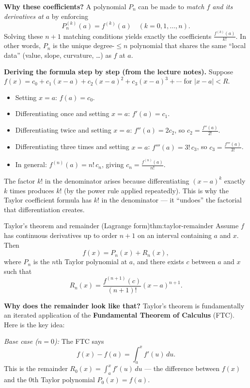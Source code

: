 \noindent\textbf{Why these coefficients?}
A polynomial $P_n$ can be made to \emph{match $f$ and its derivatives at $a$} by enforcing
\[
P_n^{(k)}(a)=f^{(k)}(a)\quad (k=0,1,\dots,n).
\]
Solving these $n{+}1$ matching conditions yields exactly the coefficients $\frac{f^{(k)}(a)}{k!}$. In other words,
$P_n$ is the unique degree-$\le n$ polynomial that shares the same ``local data'' (value, slope, curvature, \dots) as $f$ at $a$.

\noindent\textbf{Deriving the formula step by step (from the lecture notes).}
Suppose $f(x)=c_0+c_1(x-a)+c_2(x-a)^2+c_3(x-a)^3+\cdots$ for $|x-a|<R$.
\begin{itemize}[leftmargin=*]
\item Setting $x=a$: $f(a)=c_0$.
\item Differentiating once and setting $x=a$: $f'(a)=c_1$.
\item Differentiating twice and setting $x=a$: $f''(a)=2c_2$, so $c_2=\frac{f''(a)}{2!}$.
\item Differentiating three times and setting $x=a$: $f'''(a)=3!\,c_3$, so $c_3=\frac{f'''(a)}{3!}$.
\item In general: $f^{(n)}(a)=n!\,c_n$, giving $c_n=\frac{f^{(n)}(a)}{n!}$.
\end{itemize}
The factor $k!$ in the denominator arises because differentiating $(x-a)^k$ exactly $k$ times produces $k!$ (by the power rule applied repeatedly).
This is why the Taylor coefficient formula has $k!$ in the denominator --- it ``undoes'' the factorial that differentiation creates.

\begin{theorem}{Taylor's theorem and remainder (Lagrange form)}{thm:taylor-remainder}
Assume $f$ has continuous derivatives up to order $n+1$ on an interval containing $a$ and $x$.
Then
\[
f(x)=P_n(x)+R_n(x),
\]
where $P_n$ is the $n$th Taylor polynomial at $a$, and there exists $c$ between $a$ and $x$ such that
\[
R_n(x)=\frac{f^{(n+1)}(c)}{(n+1)!}(x-a)^{n+1}.
\]
\end{theorem}

\noindent\textbf{Why does the remainder look like that?}
Taylor's theorem is fundamentally an iterated application of the \textbf{Fundamental Theorem of Calculus} (FTC).
Here is the key idea:

\smallskip
\emph{Base case ($n=0$):} The FTC says
\[
f(x)-f(a)=\int_a^x f'(u)\,du.
\]
This is the remainder $R_0(x)=\int_a^x f'(u)\,du$ --- the difference between $f(x)$ and the $0$th Taylor polynomial $P_0(x)=f(a)$.

